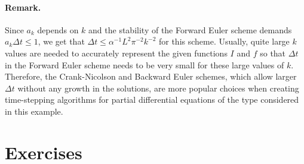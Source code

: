 \documentclass[%
oneside,                 %
final,                   %
10pt]{article}
\begin{document}
\paragraph{Remark.}
Since $a_k$ depends on $k$ and the stability of the
Forward Euler scheme demands $a_k\Delta t \leq 1$, we get that $\Delta
t \leq \alpha^{-1}L^2\pi^{-2} k^{-2}$ for this scheme.  Usually, quite
large $k$ values are needed to accurately represent the given
functions $I$ and $f$ so that $\Delta t$ in the Forward Euler scheme
needs to be very small for these large values of $k$.  Therefore, the
Crank-Nicolson and Backward Euler schemes, which allow larger $\Delta
t$ without any growth in the solutions, are more popular choices when
creating time-stepping algorithms for partial differential equations
of the type considered in this example.


\section{Exercises}
\end{document}
